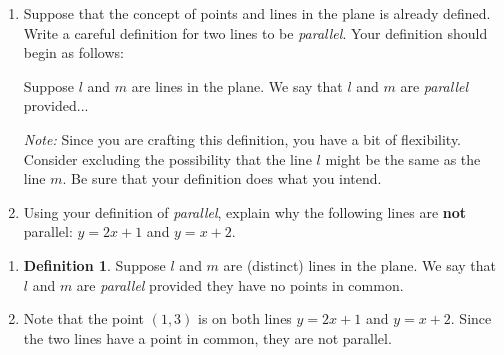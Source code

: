 \documentclass{article}
\theoremstyle{definition}
\newtheorem*{definition}{Definition}
\begin{document}
\begin{question}
    \begin{enumerate}
        \item 
        Suppose that the concept of points and lines
        in the plane is already defined.  Write a careful
        definition for two lines to be \emph{parallel}. 
        Your definition should begin as
        follows:
        \begin{center}
        Suppose $l$ and $m$ are lines in the plane. We say that $l$ and $m$ are \emph{parallel} provided...
        \end{center}

        {\emph{Note:} Since you are crafting this definition, you have a bit of flexibility.  Consider excluding the possibility that the line $l$ might be the same as the line $m$. Be sure that your definition does what you intend.}

        \item Using your definition of \emph{parallel}, explain why the following lines are \textbf{not} parallel: $y=2x+1$ and $y=x+2$.
    \end{enumerate}
\end{question}
\begin{solution}
\begin{enumerate}
\item \begin{definition}Suppose $l$ and $m$ are (distinct) lines in the plane. We say that $l$ and $m$ are \emph{parallel} provided they have no points in common.\end{definition}
\item Note that the point $(1, 3)$ is on both lines $y=2x+1$ and $y=x+2$. Since the two lines have a point in common, they are not parallel.
\end{enumerate}
\end{solution}
\end{document}
